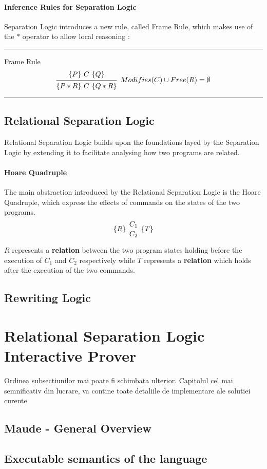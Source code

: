 \documentclass[12pt,a4paper]{article}
\begin{document}
\paragraph{Inference Rules for Separation Logic} 
Separation Logic introduces a new rule, called Frame Rule, which makes use of the \(*\) operator to allow local reasoning :
\\
\noindent\rule{\linewidth}{0.4pt}
Frame Rule
\medskip
\[
\begin{prooftree}
\Hypo{\{P\}\ C\ \{Q\}}
\Infer 1 [\(Modifies(C) \cup Free(R) = \emptyset \)]{\{P * R \}\ C\ \{Q * R\}}
\end{prooftree}		
\]
\noindent\rule{\linewidth}{0.4pt}
\subsection{Relational Separation Logic}
Relational Separation Logic builds upon the foundations layed by the Separation Logic by extending it to facilitate analysing how two programs are related. 
\paragraph{Hoare Quadruple}
The main abstraction introduced by the Relational Separation Logic is the Hoare Quadruple, which express the effects of commands on the states of the two programs. 
\[\{R\}\ {C_1 \atop C_2}\   \{T\}\]

\(R\) represents a \textbf{relation} between the two program states holding before the execution of \(C_1\) and \(C_2\) respectively while \(T\) represents a \textbf{relation} which holds after the execution of the two commands. 
\subsection{Rewriting Logic}
\section{Relational Separation Logic Interactive Prover}
Ordinea subsectiunilor mai poate fi schimbata ulterior. Capitolul cel mai semnificativ din lucrare, va contine toate detaliile de implementare ale solutiei curente
\subsection{Maude - General Overview}
\subsection{Executable semantics of the language}
\end{document}
